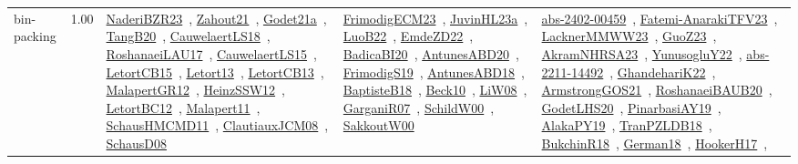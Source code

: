 {\begin{longtable}{p{3cm}r>{\raggedright\arraybackslash}p{6cm}>{\raggedright\arraybackslash}p{6cm}>{\raggedright\arraybackslash}p{8cm}}
\index{bin-packing}\index{Constraints!bin-packing}bin-packing &  1.00 & \href{../works/NaderiBZR23.pdf}{NaderiBZR23}~\cite{NaderiBZR23}, \href{../works/Zahout21.pdf}{Zahout21}~\cite{Zahout21}, \href{../works/Godet21a.pdf}{Godet21a}~\cite{Godet21a}, \href{../works/TangB20.pdf}{TangB20}~\cite{TangB20}, \href{../works/CauwelaertLS18.pdf}{CauwelaertLS18}~\cite{CauwelaertLS18}, \href{../works/RoshanaeiLAU17.pdf}{RoshanaeiLAU17}~\cite{RoshanaeiLAU17}, \href{../works/CauwelaertLS15.pdf}{CauwelaertLS15}~\cite{CauwelaertLS15}, \href{../works/LetortCB15.pdf}{LetortCB15}~\cite{LetortCB15}, \href{../works/Letort13.pdf}{Letort13}~\cite{Letort13}, \href{../works/LetortCB13.pdf}{LetortCB13}~\cite{LetortCB13}, \href{../works/MalapertGR12.pdf}{MalapertGR12}~\cite{MalapertGR12}, \href{../works/HeinzSSW12.pdf}{HeinzSSW12}~\cite{HeinzSSW12}, \href{../works/LetortBC12.pdf}{LetortBC12}~\cite{LetortBC12}, \href{../works/Malapert11.pdf}{Malapert11}~\cite{Malapert11}, \href{../works/SchausHMCMD11.pdf}{SchausHMCMD11}~\cite{SchausHMCMD11}, \href{../works/ClautiauxJCM08.pdf}{ClautiauxJCM08}~\cite{ClautiauxJCM08}, \href{../works/SchausD08.pdf}{SchausD08}~\cite{SchausD08} & \href{../works/FrimodigECM23.pdf}{FrimodigECM23}~\cite{FrimodigECM23}, \href{../works/JuvinHL23a.pdf}{JuvinHL23a}~\cite{JuvinHL23a}, \href{../works/LuoB22.pdf}{LuoB22}~\cite{LuoB22}, \href{../works/EmdeZD22.pdf}{EmdeZD22}~\cite{EmdeZD22}, \href{../works/BadicaBI20.pdf}{BadicaBI20}~\cite{BadicaBI20}, \href{../works/AntunesABD20.pdf}{AntunesABD20}~\cite{AntunesABD20}, \href{../works/FrimodigS19.pdf}{FrimodigS19}~\cite{FrimodigS19}, \href{../works/AntunesABD18.pdf}{AntunesABD18}~\cite{AntunesABD18}, \href{../works/BaptisteB18.pdf}{BaptisteB18}~\cite{BaptisteB18}, \href{../works/Beck10.pdf}{Beck10}~\cite{Beck10}, \href{../works/LiW08.pdf}{LiW08}~\cite{LiW08}, \href{../works/GarganiR07.pdf}{GarganiR07}~\cite{GarganiR07}, \href{../works/SchildW00.pdf}{SchildW00}~\cite{SchildW00}, \href{../works/SakkoutW00.pdf}{SakkoutW00}~\cite{SakkoutW00} & \href{../works/abs-2402-00459.pdf}{abs-2402-00459}~\cite{abs-2402-00459}, \href{../works/Fatemi-AnarakiTFV23.pdf}{Fatemi-AnarakiTFV23}~\cite{Fatemi-AnarakiTFV23}, \href{../works/LacknerMMWW23.pdf}{LacknerMMWW23}~\cite{LacknerMMWW23}, \href{../works/GuoZ23.pdf}{GuoZ23}~\cite{GuoZ23}, \href{../works/AkramNHRSA23.pdf}{AkramNHRSA23}~\cite{AkramNHRSA23}, \href{../works/YunusogluY22.pdf}{YunusogluY22}~\cite{YunusogluY22}, \href{../works/abs-2211-14492.pdf}{abs-2211-14492}~\cite{abs-2211-14492}, \href{../works/GhandehariK22.pdf}{GhandehariK22}~\cite{GhandehariK22}, \href{../works/ArmstrongGOS21.pdf}{ArmstrongGOS21}~\cite{ArmstrongGOS21}, \href{../works/RoshanaeiBAUB20.pdf}{RoshanaeiBAUB20}~\cite{RoshanaeiBAUB20}, \href{../works/GodetLHS20.pdf}{GodetLHS20}~\cite{GodetLHS20}, \href{../works/PinarbasiAY19.pdf}{PinarbasiAY19}~\cite{PinarbasiAY19}, \href{../works/AlakaPY19.pdf}{AlakaPY19}~\cite{AlakaPY19}, \href{../works/TranPZLDB18.pdf}{TranPZLDB18}~\cite{TranPZLDB18}, \href{../works/BukchinR18.pdf}{BukchinR18}~\cite{BukchinR18}, \href{../works/German18.pdf}{German18}~\cite{German18}, \href{../works/HookerH17.pdf}{HookerH17}~\cite{HookerH17}, 
\end{longtable}}
